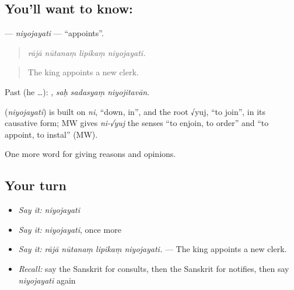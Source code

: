 \subsection*{You'll want to know: }
\textbf{} — \emph{niyojayati} — \textquotedblleft{}appoints\textquotedblright{}.

\begin{quote}
   
\end{quote}

\begin{quote}
\emph{rājā nūtanaṃ lipikaṃ niyojayati.}
\end{quote}

\begin{quote}
The king appoints a new clerk.
\end{quote}

Past (he …):   , \emph{saḥ sadasyaṃ niyojitavān}.

\begin{cousinweb}
\textbf{} (\emph{niyojayati}) is built on \emph{ni}, \textquotedblleft{}down, in\textquotedblright{}, and the root √yuj, \textquotedblleft{}to join\textquotedblright{}, in its causative form; MW gives \emph{ni-√yuj} the senses \textquotedblleft{}to enjoin, to order\textquotedblright{} and \textquotedblleft{}to appoint, to instal\textquotedblright{} (MW).
\end{cousinweb}

\begin{grammarlens}[title={What you've built}]
One more word for giving reasons and opinions.
\end{grammarlens}

\subsection*{Your turn}
\begin{itemize}
\raggedright
  \item \emph{Say it:} \emph{niyojayati}
  \item \emph{Say it:} \emph{niyojayati}, once more
  \item \emph{Say it:} \emph{rājā nūtanaṃ lipikaṃ niyojayati.} — The king appoints a new clerk.
  \item \emph{Recall:} say the Sanskrit for consults, then the Sanskrit for notifies, then say \emph{niyojayati} again
\end{itemize}

